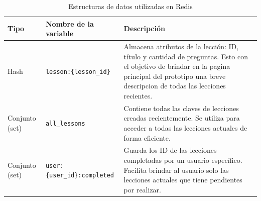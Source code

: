 \begin{table}[H]
\centering
\begin{tabular}{|p{3.5cm}|l|p{6cm}|}
\hline
\textbf{Tipo} & \textbf{Nombre de la variable} & \textbf{Descripci\'on} \\
\hline
Hash & \texttt{lesson:\{lesson\_id\}} & Almacena atributos de la lecci\'on: ID, t\'itulo y cantidad de preguntas. Esto con el objetivo de brindar en la pagina principal del prototipo una breve descripcion de todas las lecciones recientes. \\
\hline
Conjunto (set) & \texttt{all\_lessons} & Contiene todas las claves de lecciones creadas recientemente. Se utiliza para acceder a todas las lecciones actuales de forma eficiente. \\
\hline
Conjunto (set) & \texttt{user:\{user\_id\}:completed} & Guarda los ID de las lecciones completadas por un usuario espec\'ifico. Facilita brindar al usuario solo las lecciones actuales que tiene pendientes por realizar. \\
\hline
\end{tabular}
\caption{Estructuras de datos utilizadas en Redis}
\label{table:EstructurasRedis}
\end{table}
